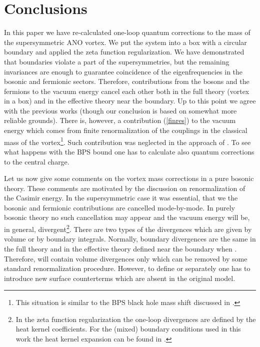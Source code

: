 \documentclass[a4paper,12pt]{article}
\begin{document}
\section{Conclusions}\label{conclu}
In this paper we have re-calculated one-loop quantum corrections
to the mass of the supersymmetric ANO vortex. We put the system
into a box with a circular boundary and applied the zeta function
regularization. We have demonstrated that boundaries violate
a part of the supersymmetries, but the remaining invariances are
enough to guarantee coincidence of the eigenfrequencies in the
bosonic and fermionic sectors. Therefore, contributions from
the bosons and the fermions to the vacuum energy cancel each 
other both in the full theory (vortex in a box) and in the 
effective theory near the boundary. Up to this point we agree with
the previous works \cite{Schmidt:cu,Lee:1994pm} (though our
conclusion is based on somewhat more reliable grounds). There is,
however,  a contribution (\ref{finres}) to the vacuum energy which comes from
finite renormalization of the couplings in the classical mass
of the vortex\footnote{This situation is similar to the BPS
black hole mass shift discussed in \cite{Rey:1996sm}.}. 
Such contribution was neglected in the approach
of \cite{Schmidt:cu,Lee:1994pm}. To see what happens with the BPS
bound one has to calculate also quantum corrections to the central
charge.

Let us now give some comments on the vortex mass corrections in
a pure bosonic theory. These comments are motivated by the 
discussion \cite{discussion} on renormalization of the Casimir
energy. In the supersymmetric case  
it was essential, that we the bosonic and fermionic contributions
are cancelled mode-by-mode. In purely bosonic theory no such
cancellation may appear and the vacuum energy will be, in general,
divergent\footnote{In the zeta function regularization the one-loop
divergences are defined by the heat kernel coefficients. 
For the (mixed) boundary conditions used in this work the heat
kernel expansion can be found in \cite{Branson:1999jz}.}.
There are two types of the divergences which are given by volume
or by boundary integrals. Normally, boundary divergences are the
same in the full theory and in the effective theory defined near
the boundary when \coordHE{}. Therefore, \coordHE{} will contain volume divergences only which can
be removed by some standard renormalization procedure. However,
to define \coordHE{} or \coordHE{} separately one has
to introduce new surface counterterms which are absent in the
original model.  
\end{document}
